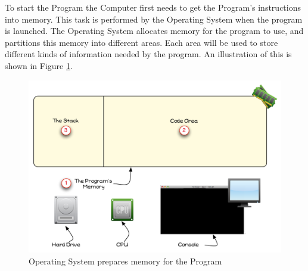To start the Program the Computer first needs to get the Program's instructions into memory. This task is performed by the Operating System when the program is launched. The Operating System allocates memory for the program to use, and partitions this memory into different areas. Each area will be used to store different kinds of information needed by the program. An illustration of this is shown in Figure \ref{fig:program-creation-visualise-helloworld-1}.

\begin{figure}[htbp]
   \centering
   \includegraphics[width=\textwidth]{./topics/program-creation/images/ProgramExecution01} 
   \caption[Program Memory Space]{Operating System prepares memory for the Program}
   \label{fig:program-creation-visualise-helloworld-1}
\end{figure}



